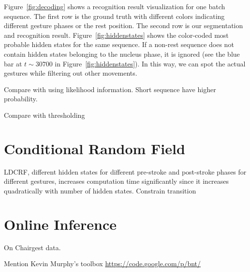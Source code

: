 Figure~\ref{fig:decoding} shows a recognition result visualization for one batch sequence. The first
row is the ground truth with different colors indicating different gesture phases or the rest position. 
The second row is our segmentation and recognition result.
Figure~\ref{fig:hiddenstates} shows the color-coded most probable hidden states
for the same sequence.
If a non-rest sequence does not contain hidden states belonging to the nucleus
phase, it is ignored (see the blue bar at $t\sim 30700$ in Figure~\ref{fig:hiddenstates}).
In this way, we can spot the actual gestures while filtering out other movements.

Compare with using likelihood information. Short sequence have higher
probability.

Compare with thresholding
 
\section{Conditional Random Field}
LDCRF, different hidden states for different pre-stroke and post-stroke phases
for different gestures, increases computation time significantly since it
increases quadratically with number of hidden states.
Constrain transition

\section{Online Inference}
On Chairgest data.

Mention Kevin Murphy's toolbox \url{https://code.google.com/p/bnt/}